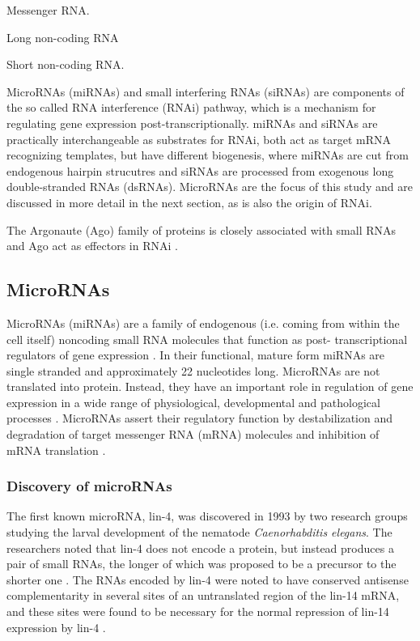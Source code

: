 Messenger RNA.

Long non-coding RNA

Short non-coding RNA.

MicroRNAs (miRNAs) and small interfering RNAs (siRNAs) are components of the
so called RNA interference (RNAi) pathway, which is a mechanism for regulating
gene expression post-transcriptionally. miRNAs and siRNAs are practically
interchangeable as substrates for RNAi, both act as target mRNA recognizing
templates, but have different biogenesis, where miRNAs are cut from endogenous hairpin
strucutres and siRNAs are processed from exogenous long double-stranded RNAs (dsRNAs).
\cite{Du2005} MicroRNAs are the focus of this study and are discussed in more
detail in the next section, as is also the origin of RNAi.

The Argonaute (Ago) family of proteins is closely associated with small RNAs and
Ago act as effectors in RNAi \cite{Ha2014}.







\subsection{MicroRNAs}\label{micrornas}

MicroRNAs (miRNAs) are a family of endogenous (i.e. coming from within the
cell itself) noncoding small RNA molecules that function as post-
transcriptional regulators of gene expression \citep{Ambros2004}. In their
functional, mature form miRNAs are single stranded and approximately 22
nucleotides long. MicroRNAs are not translated into protein. Instead, they
have an important role in regulation of gene expression in a wide range of
physiological, developmental and pathological processes \citep{Bartel2009}.
MicroRNAs assert their regulatory function by destabilization and degradation
of target messenger RNA (mRNA) molecules and inhibition of mRNA translation
\citep{Fabian2010}.



\subsubsection{Discovery of microRNAs}

The first known microRNA, lin-4, was discovered in 1993 by two research groups
studying the larval development of the nematode \emph{Caenorhabditis elegans}.
The researchers noted that lin-4 does not encode a protein, but instead
produces a pair of small RNAs, the longer of which was proposed to be a
precursor to the shorter one \citep{Lee1993}. The RNAs encoded by lin-4 were
noted to have conserved antisense complementarity in several sites of an
untranslated region of the lin-14 mRNA, and these sites were found to be
necessary for the normal repression of lin-14 expression by lin-4
\citep{Lee1993,Wightman1993}.

